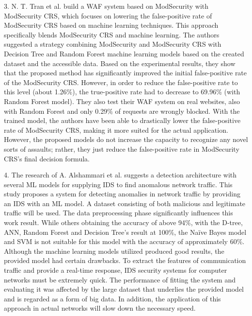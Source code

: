 3.	N. T. Tran et al. \cite{Tin} build a WAF system based on ModSecurity with ModSecurity CRS, which focuses on lowering the false-positive rate of ModSecurity CRS based on machine learning techniques. This approach specifically blends ModSecurity CRS and machine learning. The authors suggested a strategy combining ModSecurity and ModSecurity CRS with Decision Tree and Random Forest machine learning models based on the created dataset and the accessible data. Based on the experimental results, they show that the proposed method has signiﬁcantly improved the initial false-positive rate of the ModSecurity CRS. However, in order to reduce the false-positive rate to this level (about 1.26\%), the true-positive rate had to decrease to 69.96\% (with Random Forest model). They also test their WAF system on real websites, also with Random Forest and only 0.29\% of requests are wrongly blocked. With the trained model, the authors have been able to drastically lower the false-positive rate of ModSecurity CRS, making it more suited for the actual application. However, the proposed models do not increase the capacity to recognize any novel sorts of assaults; rather, they just reduce the false-positive rate in ModSecurity CRS's final decision formula.

4.	The research of A. Alshammari et al.\cite{Alshammari} suggests a detection architecture with several ML models for supplying IDS to find anomalous network traffic. This study proposes a system for detecting anomalies in network traffic by providing an IDS with an ML model. A dataset consisting of both malicious and legitimate traffic will be used. The data preprocessing phase significantly influences this work result. While others obtaining the accuracy of above 94\%, with the D-tree, ANN, Random Forest and Decision Tree's result at 100\%, the Naïve Bayes model and SVM is not suitable for this model with the accuracy of approximately 60\%. Although the machine learning models utilized produced good results, the provided model had certain drawbacks. To extract the features of communication traffic and provide a real-time response, IDS security systems for computer networks must be extremely quick. The performance of fitting the system and evaluating it was affected by the large dataset that underlies the provided model and is regarded as a form of big data. In addition, the application of this approach in actual networks will slow down the necessary speed.

